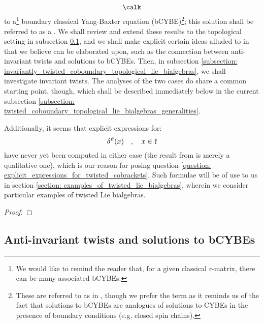             $$\calk$$
        to a\footnote{We would like to remind the reader that, for a given classical r-matrix, there can be many associated bCYBEs.} boundary classical Yang-Baxter equation (bCYBE)\footnote{These are referred to as  in \cite{schrader_integrable_systems_from_classical_reflection_equations}, though we prefer the term  as it reminds us of the fact that solutions to bCYBEs are analogues of solutions to CYBEs in the presence of boundary conditions (e.g. closed spin chains).}; this solution shall be referred to as a . We shall review and extend these results to the topological setting in subsection \ref{subsection: anti_invariantly_twisted_coboundary_topological_lie_bialgebras}, and we shall make explicit certain ideas alluded to in \cite{schrader_integrable_systems_from_classical_reflection_equations} that we believe can be elaborated upon, such as the connection between anti-invariant twists and solutions to bCYBEs. Then, in subsection \ref{subsection: invariantly_twisted_coboundary_topological_lie_bialgebras}, we shall investigate invariant twists. The analyses of the two cases do share a common starting point, though, which shall be described immediately below in the current subsection \ref{subsection: twisted_coboundary_topological_lie_bialgebras_generalities}.

        Additionally, it seems that explicit expressions for:
            $$\delta^{\vartheta}(x) \quad, \quad x \in \mathfrak{k}$$
        have never yet been computed in either case (the result from \cite{schrader_integrable_systems_from_classical_reflection_equations} is merely a qualitative one), which is our reason for posing question \ref{question: explicit_expressions_for_twisted_cobrackets}. Such formulae will be of use to us in section \ref{section: examples_of_twisted_lie_bialgebras}, wherein we consider particular examples of twisted Lie bialgebras.

        \begin{lemma} \label{lemma: invariance_criteria_for_coboundary_topological_lie_bialgebra_twists}
            
        \end{lemma}
            \begin{proof}
                
            \end{proof}

    \subsection{Anti-invariant twists and solutions to bCYBEs} \label{subsection: anti_invariantly_twisted_coboundary_topological_lie_bialgebras}
        
